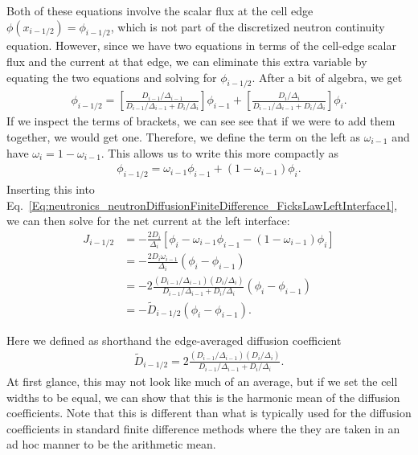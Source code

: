 Both of these equations involve the scalar flux at the cell edge $\phi(x_{i-1/2}) = \phi_{i-1/2}$, which is not part of the discretized neutron continuity equation. However, since we have two equations in terms of the cell-edge scalar flux and the current at that edge, we can eliminate this extra variable by equating the two equations and solving for $\phi_{i-1/2}$. After a bit of algebra, we get
\begin{align}
  \phi_{i-1/2} = \left[ \frac{ D_{i-1} / \Delta_{i-1} }{ D_{i-1}/\Delta_{i-1} + D_{i}/\Delta_{i} } \right] \phi_{i-1} + \left[ \frac{ D_i / \Delta_i }{ D_{i-1}/\Delta_{i-1} + D_{i}/\Delta_{i} } \right] \phi_i . 
\end{align}
If we inspect the terms of brackets, we can see see that if we were to add them together, we would get one. Therefore, we define the term on the left as $\omega_{i-1}$ and have $\omega_i = 1 - \omega_{i-1}$. This allows us to write this more compactly as
\begin{align}
  \phi_{i-1/2} = \omega_{i-1} \phi_{i-1} + ( 1 - \omega_{i-1} ) \phi_i .
\end{align}
Inserting this into Eq.~\eqref{Eq:neutronics_neutronDiffusionFiniteDifference_FicksLawLeftInterface1}, we can then solve for the net current at the left interface:
\begin{align}
  J_{i-1/2} &= -\frac{2 D_{i}}{\Delta_i} \left[ \phi_i - \omega_{i-1} \phi_{i-1} - ( 1 - \omega_{i-1} ) \phi_i \right] \nonumber \\
  			&= -\frac{2 D_{i} \omega_{i-1} }{\Delta_i} ( \phi_i - \phi_{i-1} ) \nonumber \\
			&= -2 \frac{ ( D_{i-1} / \Delta_{i-1} ) ( D_i / \Delta_i ) }{ D_{i-1} / \Delta_{i-1} + D_i / \Delta_i } ( \phi_i - \phi_{i-1} ) \nonumber \\
			&= -\widetilde{D}_{i-1/2} ( \phi_i - \phi_{i-1} ) .
\end{align}

Here we defined as shorthand the edge-averaged diffusion coefficient
\begin{align}
  \widetilde{D}_{i-1/2} = 2 \frac{ ( D_{i-1} / \Delta_{i-1} ) ( D_i / \Delta_i ) }{ D_{i-1} / \Delta_{i-1} + D_i / \Delta_i } . \label{Eq:neutronics_neutronDiffusionFiniteDifference_EdgeAverageDiffusionCoefficient}
\end{align}
At first glance, this may not look like much of an average, but if we set the cell widths to be equal, we can show that this is the harmonic mean of the diffusion coefficients. Note that this is different than what is typically used for the diffusion coefficients in standard finite difference methods where the they are taken in an ad hoc manner to be the arithmetic mean.

